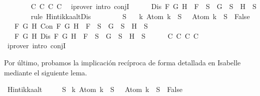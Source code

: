 \begin{isabellebody}
\ \ \ \ \ \ \isamarkupfalse%
\ C{}{}\ C{}{}\ C{}{}\ C{}{}\ \isamarkupfalse%
\ {\isacharparenleft}iprover\ intro{\isacharcolon}\ conjI{\isacharparenright}\isanewline
\ \ \ \ \isamarkupfalse%
\ {\isachardoublequoteopen}Dis\ F\ G\ H\ {\isasymlongrightarrow}\ F\ {\isasymin}\ S\ {\isasymlongrightarrow}\ G\ {\isasymin}\ S\ {\isasymor}\ H\ {\isasymin}\ S{\isachardoublequoteclose}\isanewline
\ \ \ \ \ \ \isamarkupfalse%
\ {\isacharparenleft}rule\ Hintikka{\isacharunderscore}alt{}Dis{\isacharparenright}\isanewline
\ \ \isamarkupfalse%
\isanewline
\ \ \isamarkupfalse%
\ {\isachardoublequoteopen}{\isasymbottom}\ {\isasymnotin}\ S\isanewline
\ \ {\isasymand}\ {\isacharparenleft}{\isasymforall}k{\isachardot}\ Atom\ k\ {\isasymin}\ S\ {\isasymlongrightarrow}\ \isactrlbold {\isasymnot}\ {\isacharparenleft}Atom\ k{\isacharparenright}\ {\isasymin}\ S\ {\isasymlongrightarrow}\ False{\isacharparenright}\isanewline
\ \ {\isasymand}\ {\isacharparenleft}{\isasymforall}F\ G\ H{\isachardot}\ Con\ F\ G\ H\ {\isasymlongrightarrow}\ F\ {\isasymin}\ S\ {\isasymlongrightarrow}\ G\ {\isasymin}\ S\ {\isasymand}\ H\ {\isasymin}\ S{\isacharparenright}\isanewline
\ \ {\isasymand}\ {\isacharparenleft}{\isasymforall}F\ G\ H{\isachardot}\ Dis\ F\ G\ H\ {\isasymlongrightarrow}\ F\ {\isasymin}\ S\ {\isasymlongrightarrow}\ G\ {\isasymin}\ S\ {\isasymor}\ H\ {\isasymin}\ S{\isacharparenright}{\isachardoublequoteclose}\isanewline
\ \ \ \ \isamarkupfalse%
\ C{}\ C{}\ C{}\ C{}\ \isamarkupfalse%
\ {\isacharparenleft}iprover\ intro{\isacharcolon}\ conjI{\isacharparenright}\isanewline
{}\isamarkupfalse%
%
\endisatagproof
{\isafoldproof}%
%
\isadelimproof
%
\endisadelimproof
%
\begin{isamarkuptext}%
Por último, probamos la implicación recíproca de forma detallada en Isabelle mediante
  el siguiente lema.%
\end{isamarkuptext}\isamarkuptrue%
\isamarkupfalse%
\ Hintikka{\isacharunderscore}alt{}{\isacharcolon}\isanewline
\ \ \ {\isachardoublequoteopen}{\isasymbottom}\ {\isasymnotin}\ S\isanewline
{\isasymand}\ {\isacharparenleft}{\isasymforall}k{\isachardot}\ Atom\ k\ {\isasymin}\ S\ {\isasymlongrightarrow}\ \isactrlbold {\isasymnot}\ {\isacharparenleft}Atom\ k{\isacharparenright}\ {\isasymin}\ S\ {\isasymlongrightarrow}\ False{\isacharparenright}\isanewline

\end{isabellebody}
